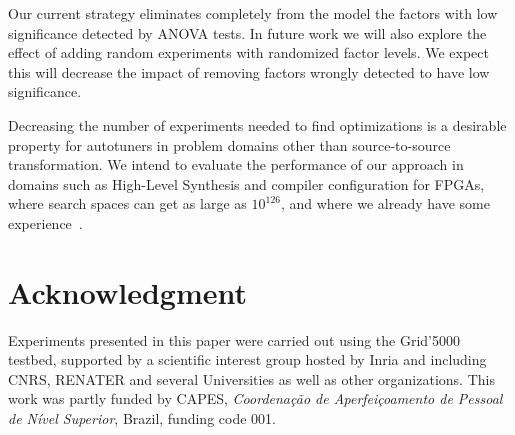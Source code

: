 \documentclass[conference]{IEEEtran}
\begin{document}
Our current strategy eliminates completely from the model the factors with low
significance detected by ANOVA tests. In future work we will also explore the
effect of adding random experiments with randomized factor levels. We expect
this will decrease the impact of removing factors wrongly detected to have low
significance.

Decreasing the number of experiments needed to find optimizations is a desirable
property for autotuners in problem domains other than source-to-source
transformation. We intend to evaluate the performance of our approach in domains
such as High-Level Synthesis and compiler configuration for FPGAs, where search
spaces can get as large as \(10^{126}\), and where we already have some
experience~\cite{bruel2017autotuninghls}.
\section*{Acknowledgment}
\label{sec:orgfa7e49b}
Experiments presented in this paper were carried out using the Grid'5000
testbed, supported by a scientific interest group hosted by Inria and including
CNRS, RENATER and several Universities as well as other organizations.
This work was partly funded by CAPES, \emph{Coordenação de Aperfeiçoamento de Pessoal
de Nível Superior}, Brazil, funding code 001.



\end{document}
